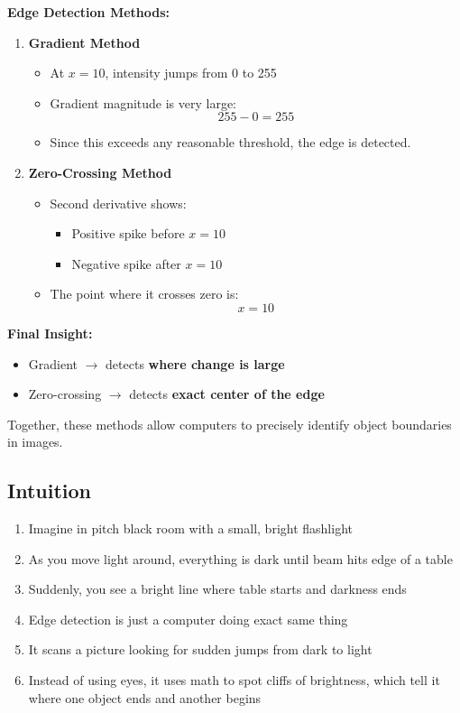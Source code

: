 \documentclass[12pt]{article}
\begin{document}
\textbf{Edge Detection Methods:}
\begin{enumerate}
    \item \textbf{Gradient Method}
          \begin{itemize}
              \item At $x=10$, intensity jumps from 0 to 255
              \item Gradient magnitude is very large:
                    \[
                        255 - 0 = 255
                    \]
              \item Since this exceeds any reasonable threshold, the edge is detected.
          \end{itemize}
    \item \textbf{Zero-Crossing Method}
          \begin{itemize}
              \item Second derivative shows:
                    \begin{itemize}
                        \item Positive spike before $x=10$
                        \item Negative spike after $x=10$
                    \end{itemize}
              \item The point where it crosses zero is:
                    \[
                        x = 10
                    \]
          \end{itemize}
\end{enumerate}

\textbf{Final Insight:}
\begin{itemize}
    \item Gradient $\rightarrow$ detects \textbf{where change is large}
    \item Zero-crossing $\rightarrow$ detects \textbf{exact center of the edge}
\end{itemize}

Together, these methods allow computers to precisely identify object boundaries in images.


\subsection{Intuition}
\begin{enumerate}
    \item Imagine in pitch black room with a small, bright flashlight
    \item As you move light around, everything is dark until beam hits edge of a table
    \item Suddenly, you see a bright line where table starts and darkness ends
    \item Edge detection is just a computer doing exact same thing
    \item It scans a picture looking for sudden jumps from dark to light
    \item Instead of using eyes, it uses math to spot cliffs of brightness, which tell it where one object ends and another begins
\end{enumerate}
\end{document}
